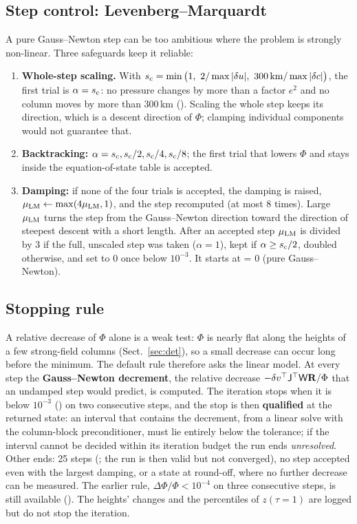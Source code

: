 \subsection{Step control: Levenberg--Marquardt}
A pure Gauss--Newton step can be too ambitious where the problem is strongly non-linear. Three safeguards keep it reliable:
\begin{enumerate}
\item \textbf{Whole-step scaling.} With $s_{\rm c}=\min\big(1,\ 2/\max|\delta u|,\ 300\,{\rm km}/\max|\delta c|\big)$, the
first trial is $\alpha=s_{\rm c}$: no pressure changes by more than a factor $e^2$ and no column moves by more than 300\,km
(). Scaling the whole step keeps its direction, which is a descent direction of $\Phi$; clamping individual
components would not guarantee that.
\item \textbf{Backtracking:} $\alpha=s_{\rm c},s_{\rm c}/2,s_{\rm c}/4,s_{\rm c}/8$; the first trial that lowers $\Phi$ and
stays inside the equation-of-state table is accepted.
\item \textbf{Damping:} if none of the four trials is accepted, the damping is raised, $\mu_{\rm LM}\leftarrow\max(4\mu_{\rm
LM},1)$, and the step recomputed (at most 8 times). Large $\mu_{\rm LM}$ turns the step from the Gauss--Newton direction
toward the direction of steepest descent with a short length. After an accepted step $\mu_{\rm LM}$ is divided by 3 if the
full, unscaled step was taken ($\alpha=1$), kept if $\alpha\ge s_{\rm c}/2$, doubled otherwise, and set to 0 once below
$10^{-3}$. It starts at  = 0 (pure Gauss--Newton).
\end{enumerate}

\subsection{Stopping rule}
A relative decrease of $\Phi$ alone is a weak test: $\Phi$ is nearly flat along the heights of a few strong-field columns
(Sect.~\ref{sec:det}), so a small decrease can occur long before the minimum. The default rule therefore asks the linear model.
At every step the \textbf{Gauss--Newton decrement}, the relative decrease $-\delta v^{\top}\mathsf J^{\top}\mathsf W\mathbf R/\Phi$ that an
undamped step would predict, is computed. The iteration stops when it is below $10^{-3}$ () on two consecutive steps,
and the stop is then \textbf{qualified} at the returned state: an interval that contains the decrement, from a linear solve with
the column-block preconditioner, must lie entirely below the tolerance; if the interval cannot be decided within its iteration
budget the run ends \emph{unresolved}. Other ends: 25 steps (; the run is then valid but not converged), no step
accepted even with the largest damping, or a state at round-off, where no further decrease can be measured. The earlier rule,
$\Delta\Phi/\Phi<10^{-4}$ on three consecutive steps, is still available (). The heights' changes and the
percentiles of $z(\tau=1)$ are logged but do not stop the iteration.

